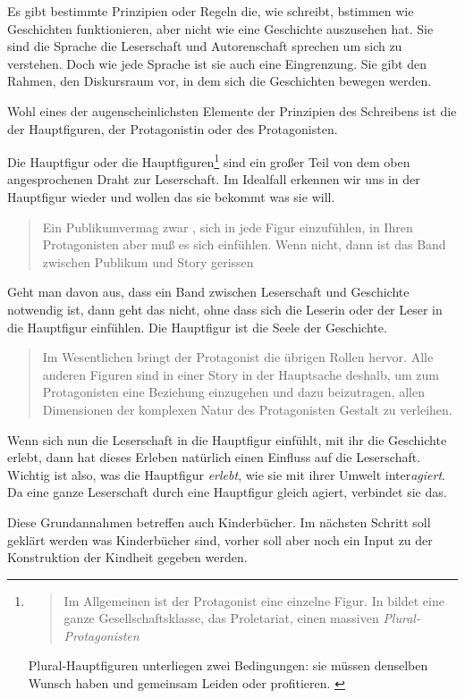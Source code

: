 Es gibt bestimmte Prinzipien oder  Regeln die, wie  schreibt, bstimmen wie Geschichten funktionieren, aber nicht wie eine Geschichte auszusehen hat.  Sie sind die Sprache die Leserschaft und Autorenschaft sprechen um sich zu verstehen. \parencite[30]{Daehnke2003} Doch wie jede Sprache ist sie auch eine Eingrenzung. Sie gibt den Rahmen, den Diskursraum vor, in dem sich die Geschichten bewegen werden.

Wohl eines der augenscheinlichsten Elemente der Prinzipien des Schreibens ist die der Hauptfiguren, der Protagonistin oder des Protagonisten. 
	
Die Hauptfigur oder die Hauptfiguren\footnote{\blockcquote[155]{McKee2001}{Im Allgemeinen ist der Protagonist eine einzelne Figur. \textelp{} In  bildet eine ganze Gesellschaftsklasse, das Proletariat, einen massiven \emph{Plural-Protagonisten}}
Plural-Hauptfiguren unterliegen zwei Bedingungen: sie müssen denselben Wunsch haben und gemeinsam Leiden oder profitieren. \parencite[155]{McKee2001}} sind ein großer Teil von dem oben angesprochenen Draht zur Leserschaft. Im Idealfall erkennen wir uns in der Hauptfigur wieder und wollen das sie bekommt was sie will. \parencite[161]{McKee2001} \blockcquote[161]{McKee2001}{Ein Publikum\textelp{}vermag zwar , sich in jede Figur einzufühlen, in Ihren Protagonisten aber muß es sich einfühlen. Wenn nicht, dann ist das Band zwischen Publikum und Story gerissen}
Geht man davon aus, dass ein Band zwischen Leserschaft und Geschichte notwendig ist, dann geht das nicht, ohne dass sich die Leserin oder der Leser in die Hauptfigur einfühlen. Die Hauptfigur ist die Seele der Geschichte.  \blockcquote[407]{McKee2001}{Im Wesentlichen bringt der Protagonist die übrigen Rollen hervor. Alle anderen Figuren sind in einer Story in der Hauptsache deshalb, um zum Protagonisten eine Beziehung einzugehen und dazu beizutragen, allen Dimensionen der komplexen Natur des Protagonisten Gestalt zu verleihen.}  
Wenn sich nun die Leserschaft in die Hauptfigur einfühlt, mit ihr die Geschichte erlebt, dann hat dieses Erleben natürlich einen Einfluss auf die Leserschaft. Wichtig ist also, was die Hauptfigur \emph{erlebt}, wie sie mit ihrer Umwelt inter\emph{agiert}. Da eine ganze Leserschaft durch eine Hauptfigur gleich agiert, verbindet sie das.
	
Diese Grundannahmen betreffen auch Kinderbücher. Im nächsten Schritt soll geklärt werden was Kinderbücher sind, vorher soll aber noch ein Input zu der Konstruktion der Kindheit gegeben werden.

